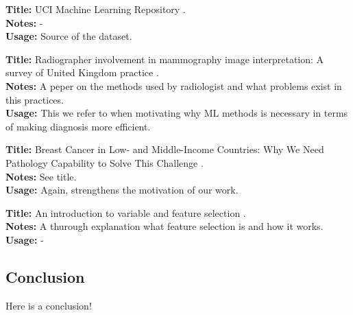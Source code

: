 \documentclass[a4paper]{article}
\begin{document}
\noindent
\textbf{Title:} {UCI} Machine Learning Repository \cite{dua:2017}.
\\
\textbf{Notes:} -
\\
\textbf{Usage:} Source of the dataset.
\\\par

\noindent
\textbf{Title:} Radiographer involvement in mammography image interpretation: A survey of United Kingdom practice \cite{culpan2016}.
\\
\textbf{Notes:} A peper on the methods used by radiologist and what problems exist in this practices.
\\
\textbf{Usage:} This we refer to when motivating why ML methods is necessary in terms of making diagnosis more efficient.
\\\par

\noindent
\textbf{Title:} Breast Cancer in Low- and Middle-Income Countries: Why We Need Pathology Capability to Solve This Challenge \cite{martei2018}.
\\
\textbf{Notes:} See title.
\\
\textbf{Usage:} Again, strengthens the motivation of our work.
\\\par

\noindent
\textbf{Title:} An introduction to variable and feature selection \cite{guyon2003}.
\\
\textbf{Notes:} A thurough explanation what feature selection is and how it works.
\\
\textbf{Usage:} -
\\\par

\subsection{Conclusion}

Here is a conclusion!



\end{document}
